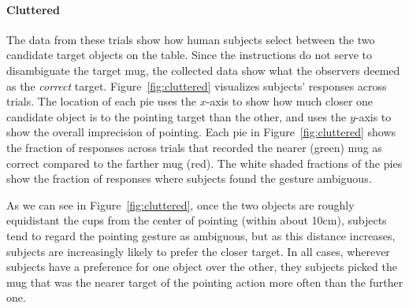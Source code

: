 \paragraph{Cluttered}
The data from these trials show how human subjects select between the two candidate target objects on the table. Since the instructions do not serve to disambiguate the target mug, the collected data show what the observers deemed as the \textit{correct} target.  Figure~\ref{fig:cluttered} visualizes subjects' responses across trials.  The location of each pie uses the $x$-axis to show how much closer one candidate object is to the pointing target than the other, and uses the $y$-axis to show the overall imprecision of pointing.  Each pie in Figure~\ref{fig:cluttered} shows the fraction of responses across trials that recorded the nearer (green) mug as correct compared to the farther mug (red). The white shaded fractions of the pies show the fraction of responses where subjects found the gesture ambiguous.

As we can see in Figure~\ref{fig:cluttered}, once the two objects are roughly equidistant the cups from the center of pointing (within about 10cm), subjects tend to regard the pointing gesture as ambiguous, but as this distance increases, subjects are increasingly likely to prefer the closer target.  In all cases, wherever subjects have a preference for one object over the other, they subjects picked the mug that was the nearer target of the pointing action more often than the further one.


